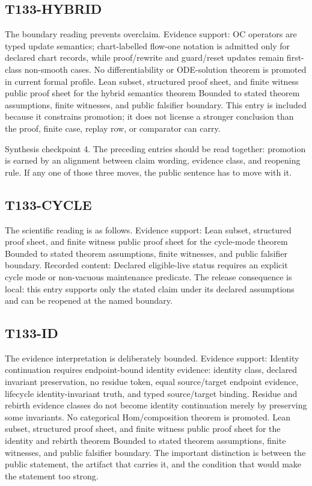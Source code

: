 \subsection{T133-HYBRID}
The boundary reading prevents overclaim. Evidence support: OC operators are typed update semantics; chart-labelled flow-one notation is admitted only for declared chart records, while proof/rewrite and guard/reset updates remain first-class non-smooth cases. No differentiability or ODE-solution theorem is promoted in current formal profile. Lean subset, structured proof sheet, and finite witness public proof sheet for the hybrid semantics theorem Bounded to stated theorem assumptions, finite witnesses, and public falsifier boundary. This entry is included because it constrains promotion; it does not license a stronger conclusion than the proof, finite case, replay row, or comparator can carry.

Synthesis checkpoint 4. The preceding entries should be read together: promotion is earned by an alignment between claim wording, evidence class, and reopening rule. If any one of those three moves, the public sentence has to move with it.

\subsection{T133-CYCLE}
The scientific reading is as follows. Evidence support: Lean subset, structured proof sheet, and finite witness public proof sheet for the cycle-mode theorem Bounded to stated theorem assumptions, finite witnesses, and public falsifier boundary. Recorded content: Declared eligible-live status requires an explicit cycle mode or non-vacuous maintenance predicate. The release consequence is local: this entry supports only the stated claim under its declared assumptions and can be reopened at the named boundary.

\subsection{T133-ID}
The evidence interpretation is deliberately bounded. Evidence support: Identity continuation requires endpoint-bound identity evidence: identity class, declared invariant preservation, no residue token, equal source/target endpoint evidence, lifecycle identity-invariant truth, and typed source/target binding. Residue and rebirth evidence classes do not become identity continuation merely by preserving some invariants. No categorical Hom/composition theorem is promoted. Lean subset, structured proof sheet, and finite witness public proof sheet for the identity and rebirth theorem Bounded to stated theorem assumptions, finite witnesses, and public falsifier boundary. The important distinction is between the public statement, the artifact that carries it, and the condition that would make the statement too strong.

